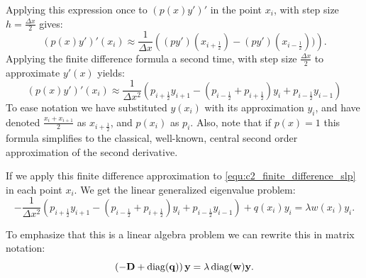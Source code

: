 Applying this expression once to $(p(x) y')'$ in the point $x_i$, with step size $h = \frac{\Delta x}{2}$ gives:
$$
    (p(x) y')'(x_i) \approx \frac{1}{\Delta x}\left((p y')\left(x_{i+\frac{1}{2}}\right) - (p y')\left(x_{i-\frac{1}{2}}\right))\right)\text{.}
$$
Applying the finite difference formula a second time, with step size $\frac{\Delta x}{2}$ to approximate $y'(x)$ yields:
$$
    (p(x) y')'(x_i) \approx \frac{1}{\Delta x^2}\left(p_{i+\frac{1}{2}} y_{i+1} - \left(p_{i-\frac{1}{2}} + p_{i+\frac{1}{2}}\right) y_i + p_{i-\frac{1}{2}} y_{i-1}\right)
$$
To ease notation we have substituted $y(x_i)$ with its approximation $y_i$, and have denoted $\frac{x_i + x_{i+1}}{2}$ as $x_{i+\frac{1}{2}}$, and $p(x_i)$ as $p_i$. Also, note that if $p(x) = 1$ this formula simplifies to the classical, well-known, central second order approximation of the second derivative.

If we apply this finite difference approximation to \eqref{equ:c2_finite_difference_slp} in each point $x_i$. We get the linear generalized eigenvalue problem:
$$
    -\frac{1}{\Delta x^2}\left(p_{i+\frac{1}{2}} y_{i+1} - \left(p_{i-\frac{1}{2}} + p_{i+\frac{1}{2}}\right) y_i + p_{i-\frac{1}{2}} y_{i-1}\right) + q(x_i) y_i = \lambda w(x_i) y_i \text{.}
$$

To emphasize that this is a linear algebra problem we can rewrite this in matrix notation:
\begin{equation}\label{equ:c2_finite_difference_matrix_problem}
    \left(-\vb{D} + \operatorname{diag}(\vb{q})\right)\vb{y} = \lambda \operatorname{diag}(\vb{w}) \vb{y}\text{.}
\end{equation}

